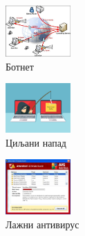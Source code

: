 \documentclass[compress, containsverbatim,mathserif, xcolor=dvipsnames, unicode]{beamer}
\begin{document}
\begin{frame}

\begin{figure}[h!]
    \centering
    \begin{center}
    \includegraphics[width=25mm]{slike/botnet.png}
    \caption{Ботнет}
    \end{center}
\end{figure}

\begin{figure}[h!]
    \centering
    \begin{center}
    \includegraphics[width=25mm]{slike/target.jpg}
    \caption{Циљани напад}
    \end{center}
\end{figure}

\begin{figure}[h!]
    \centering
    \begin{center}
    \includegraphics[width=25mm]{slike/avg.jpg}
    \caption{Лажни антивирус}
    \end{center}
\end{figure}

\end{frame}
\end{document}
